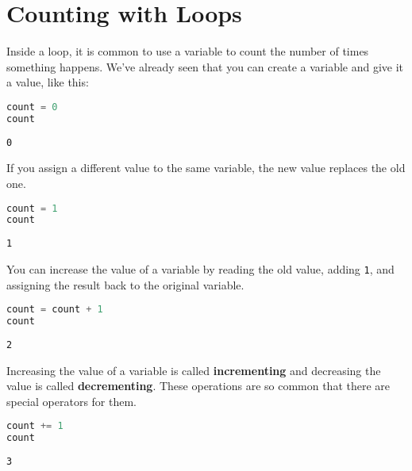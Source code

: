\section{Counting with Loops}\label{counting-with-loops}

Inside a loop, it is common to use a variable to count the number of
times something happens. We've already seen that you can create a
variable and give it a value, like this:

\begin{lstlisting}[language=Python,style=source]
count = 0
count
\end{lstlisting}

\begin{lstlisting}[style=output]
0
\end{lstlisting}

\pagebreak

If you assign a different value to the same variable, the new value
replaces the old one.

\begin{lstlisting}[language=Python,style=source]
count = 1
count
\end{lstlisting}

\begin{lstlisting}[style=output]
1
\end{lstlisting}

You can increase the value of a variable by reading the old value,
adding \passthrough{\lstinline!1!}, and assigning the result back to the
original variable.

\begin{lstlisting}[language=Python,style=source]
count = count + 1
count
\end{lstlisting}

\begin{lstlisting}[style=output]
2
\end{lstlisting}

Increasing the value of a variable is called \textbf{incrementing} and
decreasing the value is called \textbf{decrementing}. These operations
are so common that there are special operators for them.

\begin{lstlisting}[language=Python,style=source]
count += 1
count
\end{lstlisting}

\begin{lstlisting}[style=output]
3
\end{lstlisting}

